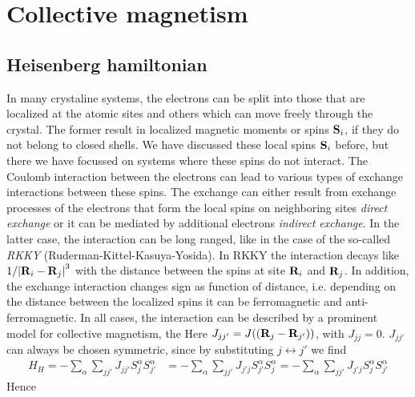 
\section{Collective magnetism }

\subsection{Heisenberg hamiltonian}
In many crystaline  systems, the electrons can be split into those that are localized at the atomic sites and others which can move freely through the crystal. The former result in localized
magnetic moments or spins $\mathbf S_{i}$, if they do not belong to closed shells. 
We have discussed these  local spins $\mathbf S_{i}$ before, but there we have focussed on systems where these spins do not interact. 
The Coulomb interaction between the electrons can lead to various types of exchange interactions
between these spins. The exchange can either result from exchange processes of the electrons that form the local spins on neighboring sites {\em direct exchange} or it can be mediated by
additional electrons {\em indirect exchange}. In the latter case, the interaction can be long ranged, like in the case of the so-called {\em RKKY} (Ruderman-Kittel-Kasuya-Yosida). 
In RKKY the interaction decays like $1/\abs{\mathbf R_{i}-\mathbf R_{j}}^{3}$ with the distance between the spins at site 
$\mathbf R_{i}$ and $\mathbf R_{j}$. In addition, the exchange interaction  changes sign as function of distance, i.e.
depending on the distance between the localized spins it can be ferromagnetic and anti-ferromagnetic. In all cases, the interaction can be described by a prominent model for collective magnetism, the 
Here $J_{jj'} = J((\mathbf R_{j}-\mathbf R_{j'}))$, with $J_{jj}=0$.
 $J_{jj'}$ can always be chosen symmetric, since by substituting $j\leftrightarrow j'$ we find
%
\begin{align*}
H_{H}= -\sum_{\alpha}\sum_{jj'} J_{jj'} S^{\alpha}_{j}S^{\alpha}_{j'} &= -\sum_{\alpha}\sum_{jj'} J_{j'j} S^{\alpha}_{j'}S^{\alpha}_{j} =-\sum_{\alpha}\sum_{jj'} J_{j'j} S^{\alpha}_{j}S^{\alpha}_{j'} 
\end{align*}
%
Hence 
